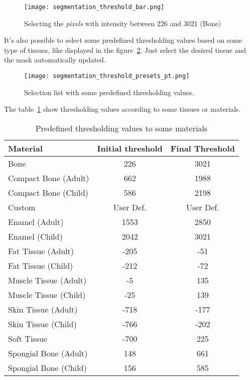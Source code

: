 \begin{figure}[!htb]
\centering
\texttt{[image: segmentation\_threshold\_bar.png]}
\caption{Selecting the \textit{pixels} with intensity between $226$ and $3021$ (Bone)}
\label{fig:region_selection_bar}
\end{figure}

It's also possible to select some predefined thresholding values based on some type of tissues, like displayed in the figure~\ref{fig:limiar_presets}. Just select the desired tissue and the mask automatically updated.

\begin{figure}[!htb]
\centering
\texttt{[image: segmentation\_threshold\_presets\_pt.png]}
\caption{Selection list with some predefined thresholding values.}
\label{fig:limiar_presets}
\end{figure}

The table~\ref{tab:limiar} show thresholding values according to some tissues or materials.

\begin{table}[h]
\centering
\caption{Predefined thresholding values to some materials}
\begin{tabular}{lcc}\\
\hline %
Material & Initial threshold & Final Threshold\\
\hline
\hline
Bone & 226 & 3021\\
Compact Bone (Adult) & 662 & 1988\\
Compact Bone (Child) & 586 & 2198\\
Custom & User Def. & User Def.\\
Enamel (Adult) & 1553 & 2850\\
Enamel (Child) & 2042 & 3021\\
Fat Tissue (Adult) & -205 & -51\\
Fat Tissue (Child) & -212 & -72\\
Muscle Tissue (Adult) & -5 & 135\\
Muscle Tissue (Child) & -25 & 139\\
Skin Tissue (Adult) & -718 & -177\\
Skin Tissue (Child) & -766 & -202\\
Soft Tissue & -700 & 225\\
Spongial Bone (Adult) & 148 & 661\\
Spongial Bone (Child) & 156 & 585\\
\hline
\end{tabular}
\label{tab:limiar}
\end{table} 
\newpage

